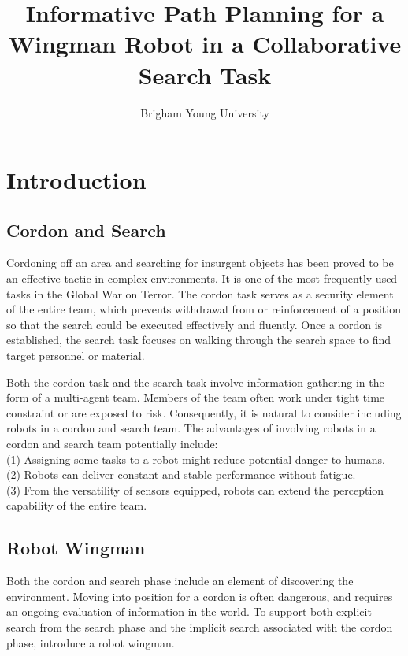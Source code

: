 \documentclass[12pt]{article}
\begin{document}
\title{\textsf{Informative Path Planning for a Wingman Robot in a Collaborative Search Task}}
\date{\textsf{Brigham Young University}}

\maketitle

\section{Introduction}

\subsection{Cordon and Search}

Cordoning off an area and searching for insurgent objects has been proved to be an effective tactic in complex environments. It is one of the most frequently used tasks in the Global War on Terror. The cordon task serves as a security element of the entire team, which prevents withdrawal from or reinforcement of a position so that the search could be executed effectively and fluently. Once a cordon is established, the search task focuses
on walking through the search space to find target personnel or material.

Both the cordon task and the search task involve information gathering in the form of a multi-agent team. Members of the team often work under tight time constraint or are exposed to risk. Consequently, it is natural to consider including robots in a cordon and search team. The advantages of involving robots in a cordon and search team potentially include: \\
(1) Assigning some tasks to a robot might reduce potential danger to humans. \\
(2) Robots can deliver constant and stable performance without fatigue. \\
(3) From the versatility of sensors equipped, robots can extend the perception capability of the entire team.

\subsection{Robot Wingman}

Both the cordon and search phase include an element of discovering the environment. Moving into position for a cordon is often dangerous, and requires an ongoing evaluation of information in the world. To support both explicit search from the search phase and the implicit search associated with the cordon phase, \cite{goodrich2013toward} introduce a robot wingman. 
\end{document}
